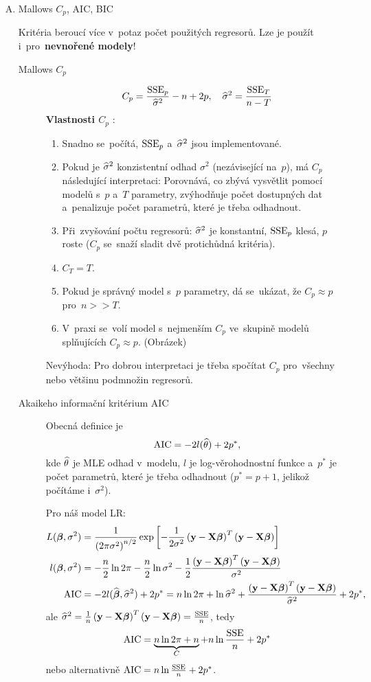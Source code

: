 \begin{enumerate}[A)]
\item
Mallows $C_p$, AIC, BIC

Kritéria beroucí více v~potaz počet použitých regresorů. Lze je použít i~pro~\textbf{nevnořené modely}!
\begin{description}
\item[Mallows $C_p$]
 $$
C_p = \frac{\mathrm{SSE}_p}{\widehat{\sigma}^2} - n + 2p, \quad \widehat{\sigma}^2 = \frac{\mathrm{SSE}_T}{n-T}
 $$
\textbf{Vlastnosti $C_p$ }:
\begin{enumerate}[1)]
\item Snadno se~počítá, $\mathrm{SSE}_p$ a~$\widehat{\sigma}^2$ jsou implementované.
\item Pokud je $\widehat{\sigma}^2$ konzistentní odhad $\sigma^2$ (nezávisející na~$p$), má $C_p$ následující interpretaci: Porovnává, co zbývá vysvětlit pomocí modelů s~$p$ a~$T$ parametry, zvýhodňuje počet dostupných dat a~penalizuje počet parametrů, které je třeba odhadnout.
\item Při~zvyšování počtu regresorů: $\widehat{\sigma}^2$ je konstantní, $\mathrm{SSE}_p$ klesá, $p$ roste ($C_p$ se~snaží sladit dvě protichůdná kritéria).
\item $C_T = T$.
\item Pokud je správný model s~$p$ parametry, dá se~ukázat, že $C_p \approx p$ pro~$n >> T$.
\item V~praxi se~volí model s~nejmenším $C_p$ ve~skupině modelů splňujících $C_p \approx p$. (Obrázek)
\end{enumerate}

\begin{remark}
Nevýhoda: Pro dobrou interpretaci je třeba spočítat $C_p$ pro~všechny nebo většinu podmnožin regresorů.
\end{remark}

\item[Akaikeho informační kritérium AIC]

\newcommand{\AIC}{\mathrm{AIC}}
Obecná definice je
 $$
\AIC = -2l(\wtheta) + 2p^*,
 $$
kde $\widehat{\theta}$ je MLE odhad v~modelu, $l$ je log-věrohodnostní funkce a~$p^*$ je počet parametrů, které je třeba odhadnout ($p^* = p + 1$, jelikož počítáme i~$\sigma^2$).

Pro náš model LR:
\begin{align*}
L(\betab,\sigma^2) & = \frac{1}{\left(2\pi \sigma^2\right)^{n/2}} \exp \left[- \frac{1}{2\sigma^2} \left(\y - \X \betab \right)^T \left(\y - \X \betab \right) \right] \\
l(\betab, \sigma^2) & = - \frac{n}{2} \ln 2\pi - \frac{n}{2} \ln \sigma^2 - \frac{1}{2} \frac{\left(\y - \X \betab \right)^T \left(\y - \X \betab \right)}{\sigma^2} \\
\AIC & = -2l(\wbetab, \wsigma^2) + 2p^* = n \ln 2\pi + \ln \wsigma^2 + \frac{\left(\y - \X \betab \right)^T \left(\y - \X \betab \right)}{\wsigma^2} + 2p^*,
\end{align*}
ale $\widehat{\sigma}^2 = \frac{1}{n} \left(\mathbf{y} - \mathbf{X} \boldsymbol{\beta} \right)^T \left(\mathbf{y} - \mathbf{X} \boldsymbol{\beta} \right) = \frac{\mathrm{SSE}}{n}$, tedy
 $$
\AIC = \underbrace{n \ln 2 \pi + n}_C + n \ln \frac{\SSE}{n} + 2p^*
 $$
nebo alternativně $\AIC = n \ln \frac{\SSE}{n} + 2p^*$.


\end{description}
\end{enumerate}
